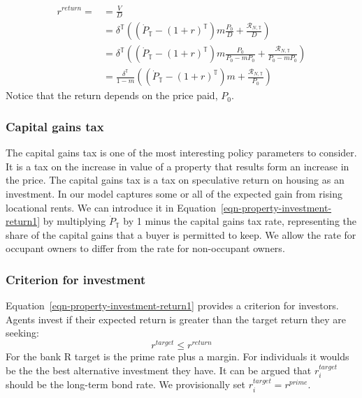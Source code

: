 {\begin{align}
r^{return} =
  &= \frac{V}{D}  \nonumber \\
  &= \delta^\mathbb{T} \left((\dot P_\mathbb{T} - (1+r)^\mathbb{T})m \frac{P_0}{D} + \frac{\mathcal{R}_{N, \mathbb{T}}}{D}\right)\\
   &= \delta^\mathbb{T} \left((\dot P_\mathbb{T} - (1+r)^\mathbb{T})m \frac{P_0}{P_0-mP_0} + \frac{\mathcal{R}_{N, \mathbb{T}}}{P_0-mP_0}\right)\\
  &= \frac{\delta^\mathbb{T}}{1-m} \left((\dot P_\mathbb{T} - (1+r)^\mathbb{T})m  + \frac{\mathcal{R}_{N, \mathbb{T}}}{P_0}\right)\label{eqn-property-investment-return1} 
\end{align}
Notice that the return depends on the price paid, $P_0$. 

\subsubsection{Capital gains tax}
The \gls{capital gains tax} is one of the most interesting policy parameters to consider. It is a tax on the increase in value of a property that results form an increase in the price. The capital gains tax is a tax on speculative return on housing as an investment. In our model captures some or all of the expected gain from rising locational rents. We can introduce it in Equation~\ref{eqn-property-investment-return1} by multiplying $\dot P_\mathbb{T}$ by 1 minus the capital gains tax rate, representing the share of the capital gains that a buyer is permitted to keep. We allow the rate for occupant owners to differ from the rate for non-occupant owners.


\subsubsection{Criterion for investment}
Equation~\ref{eqn-property-investment-return1} provides a criterion for investors. %
 Agents invest if  their expected return is greater than the target return they are seeking:
\begin{equation}
r^{target}\le r^{return} 
\label{eqn-property-investment-return2}
\end{equation}
For the bank R target is the prime rate plus a margin. For individuals it woulds be the the best alternative investment they have. It can be argued that  $r^{target}_i$ should be the long-term bond rate. We provisionally set $r^{target}_i=r^{prime}$.

}
